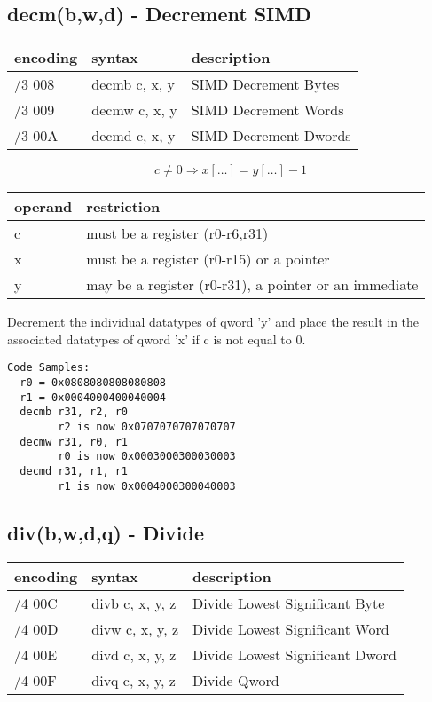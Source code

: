 \documentclass[letterpaper,10pt,openright,twoside,onecolumn]{book}
\begin{document}
\newpage\subsection{decm(b,w,d) - Decrement SIMD}
  \begin{tabular}{|l|l|l|}
   \hline
    encoding & syntax & description \\
   \hline
    /3 008 & decmb c, x, y & SIMD Decrement Bytes \\
    /3 009 & decmw c, x, y & SIMD Decrement Words \\
    /3 00A & decmd c, x, y & SIMD Decrement Dwords \\
   \hline
  \end{tabular}

  \begin{displaymath} c \neq 0 \Rightarrow x[\ldots] = y[\ldots] - 1\end{displaymath}

  \flushleft
  \begin{tabular}{|l|l|}
   \hline
    operand & restriction \\
   \hline
    c & must be a register (r0-r6,r31) \\
    x & must be a register (r0-r15) or a pointer \\
    y & may be a register (r0-r31), a pointer or an immediate \\
   \hline
  \end{tabular}

  Decrement the individual datatypes of qword 'y' and place the result in the
  associated datatypes of qword 'x' if c is not equal to 0.

  \begin{verbatim}
Code Samples:
  r0 = 0x0808080808080808
  r1 = 0x0004000400040004
  decmb r31, r2, r0
        r2 is now 0x0707070707070707
  decmw r31, r0, r1
        r0 is now 0x0003000300030003
  decmd r31, r1, r1
        r1 is now 0x0004000300040003
  \end{verbatim}
\newpage\subsection{div(b,w,d,q) - Divide}
  \begin{tabular}{|l|l|l|}
   \hline
    encoding & syntax & description \\
   \hline
    /4 00C & divb c, x, y, z & Divide Lowest Significant Byte \\
    /4 00D & divw c, x, y, z & Divide Lowest Significant Word \\
    /4 00E & divd c, x, y, z & Divide Lowest Significant Dword \\
    /4 00F & divq c, x, y, z & Divide Qword \\
   \hline
  \end{tabular}
\end{document}

